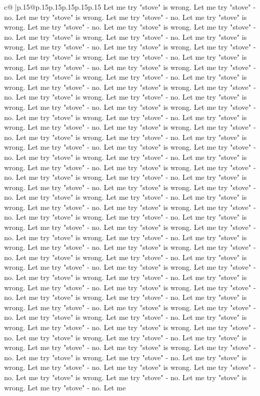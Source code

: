 \documentclass{article}
\begin{document}
{\begin{supertabular}{c@{$\;$}|p{.15\linewidth}@{}p{.15\linewidth}p{.15\linewidth}p{.15\linewidth}p{.15\linewidth}p{.15\linewidth}}
{{{Let me try "stove" is wrong. Let me try "stove" {-} no. Let me try "stove" is wrong. Let me try "stove" {-} no. Let me try "stove" is wrong. Let me try "stove" {-} no. Let me try "stove" is wrong. Let me try "stove" {-} no. Let me try "stove" is wrong. Let me try "stove" {-} no. Let me try "stove" is wrong. Let me try "stove" {-} no. Let me try "stove" is wrong. Let me try "stove" {-} no. Let me try "stove" is wrong. Let me try "stove" {-} no. Let me try "stove" is wrong. Let me try "stove" {-} no. Let me try "stove" is wrong. Let me try "stove" {-} no. Let me try "stove" is wrong. Let me try "stove" {-} no. Let me try "stove" is wrong. Let me try "stove" {-} no. Let me try "stove" is wrong. Let me try "stove" {-} no. Let me try "stove" is wrong. Let me try "stove" {-} no. Let me try "stove" is wrong. Let me try "stove" {-} no. Let me try "stove" is wrong. Let me try "stove" {-} no. Let me try "stove" is wrong. Let me try "stove" {-} no. Let me try "stove" is wrong. Let me try "stove" {-} no. Let me try "stove" is wrong. Let me try "stove" {-} no. Let me try "stove" is wrong. Let me try "stove" {-} no. Let me try "stove" is wrong. Let me try "stove" {-} no. Let me try "stove" is wrong. Let me try "stove" {-} no. Let me try "stove" is wrong. Let me try "stove" {-} no. Let me try "stove" is wrong. Let me try "stove" {-} no. Let me try "stove" is wrong. Let me try "stove" {-} no. Let me try "stove" is wrong. Let me try "stove" {-} no. Let me try "stove" is wrong. Let me try "stove" {-} no. Let me try "stove" is wrong. Let me try "stove" {-} no. Let me try "stove" is wrong. Let me try "stove" {-} no. Let me try "stove" is wrong. Let me try "stove" {-} no. Let me try "stove" is wrong. Let me try "stove" {-} no. Let me try "stove" is wrong. Let me try "stove" {-} no. Let me try "stove" is wrong. Let me try "stove" {-} no. Let me try "stove" is wrong. Let me try "stove" {-} no. Let me try "stove" is wrong. Let me try "stove" {-} no. Let me try "stove" is wrong. Let me try "stove" {-} no. Let me try "stove" is wrong. Let me try "stove" {-} no. Let me try "stove" is wrong. Let me try "stove" {-} no. Let me try "stove" is wrong. Let me try "stove" {-} no. Let me try "stove" is wrong. Let me try "stove" {-} no. Let me try "stove" is wrong. Let me try "stove" {-} no. Let me try "stove" is wrong. Let me try "stove" {-} no. Let me try "stove" is wrong. Let me try "stove" {-} no. Let me try "stove" is wrong. Let me try "stove" {-} no. Let me try "stove" is wrong. Let me try "stove" {-} no. Let me try "stove" is wrong. Let me try "stove" {-} no. Let me try "stove" is wrong. Let me try "stove" {-} no. Let me try "stove" is wrong. Let me try "stove" {-} no. Let me try "stove" is wrong. Let me try "stove" {-} no. Let me try "stove" is wrong. Let me try "stove" {-} no. Let me try "stove" is wrong. Let me try "stove" {-} no. Let me try "stove" is wrong. Let me try "stove" {-} no. Let me try "stove" is wrong. Let me try "stove" {-} no. Let me try "stove" is wrong. Let me try "stove" {-} no. Let me try "stove" is wrong. Let me try "stove" {-} no. Let me try "stove" is wrong. Let me try "stove" {-} no. Let me try "stove" is wrong. Let me try "stove" {-} no. Let me }}}
\end{supertabular}}
\end{document}
